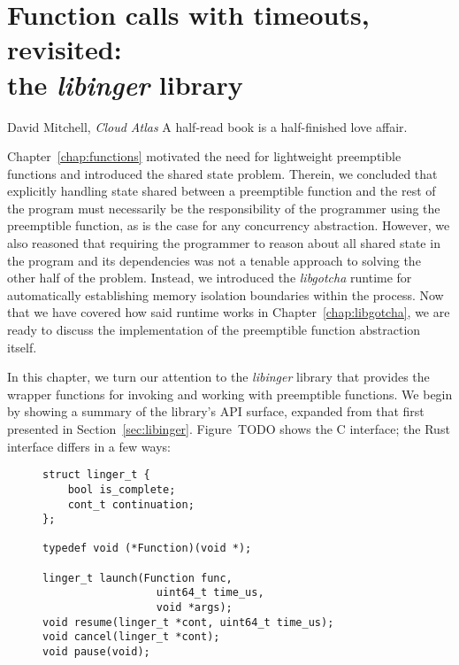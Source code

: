 \chapter{Function calls with timeouts, revisited: \\ the \textit{libinger} library}
\label{chap:libinger}

\ifdefined\chapquotes
\vspace{-0.5in}
\begin{chapquote}[1.5in]{David Mitchell, \textit{Cloud Atlas}}
A half-read book is a half-finished love affair.
\end{chapquote}
\fi


Chapter~\ref{chap:functions} motivated the need for lightweight preemptible functions
and introduced the shared state problem.  Therein, we concluded that explicitly
handling state shared between a preemptible function and the rest of the program must
necessarily be the responsibility of the programmer using the preemptible function,
as is the case for any concurrency abstraction.  However, we also reasoned that
requiring the programmer to reason about all shared state in the program and its
dependencies was not a tenable approach to solving the other half of the problem.
Instead, we introduced the \textit{libgotcha} runtime for automatically establishing
memory isolation boundaries within the process.  Now that we have covered how said
runtime works in Chapter~\ref{chap:libgotcha}, we are ready to discuss the
implementation of the preemptible function abstraction itself.

In this chapter, we turn our attention to the \textit{libinger} library that provides
the wrapper functions for invoking and working with preemptible functions.  We begin
by showing a summary of the library's API surface, expanded from that first presented
in Section~\ref{sec:libinger}.  Figure~TODO shows the C interface; the Rust interface
differs in a few ways:



\begin{figure}
\begin{lstlisting}[label=lst:ingerfullapi,caption=Preemptible functions extended C interface,morekeywords=uint64_t]
struct linger_t {
	bool is_complete;
	cont_t continuation;
};

typedef void (*Function)(void *);

linger_t launch(Function func,
                  uint64_t time_us,
                  void *args);
void resume(linger_t *cont, uint64_t time_us);
void cancel(linger_t *cont);
void pause(void);
\end{lstlisting}
\end{figure}

